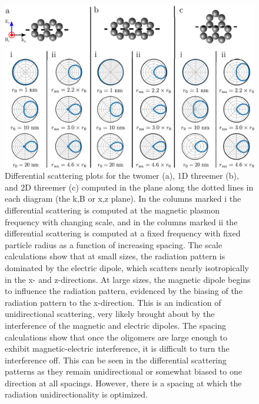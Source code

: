 \documentclass[12pt, letterpaper, twoside]{report}
\begin{document}
\begin{figure}
\centering
\includegraphics[width=6in]{beaming.pdf}
\caption{Differential scattering plots for the twomer (a), 1D threemer (b), and 2D threemer (c) computed in the plane along the dotted lines in each diagram (the k,B or x,z plane). In the columns marked i the differential scattering is computed at the magnetic plasmon frequency with changing scale, and in the columns marked ii the differential scattering is computed at a fixed frequency with fixed particle radius as a function of increasing spacing. The scale calculations show that at small sizes, the radiation pattern is dominated by the electric dipole, which scatters nearly isotropically in the x- and z-directions. At large sizes, the magnetic dipole begins to influence the radiation pattern, evidenced by the biasing of the radiation pattern to the x-direction. This is an indication of unidirectional scattering, very likely brought about by the interference of the magnetic and electric dipoles. The spacing calculations show that once the oligomers are large enough to exhibit magnetic-electric interference, it is difficult to turn the interference off. This can be seen in the differential scattering patterns as they remain unidirectional or somewhat biased to one direction at all spacings. However, there is a spacing at which the radiation unidirectionality is optimized.}
\label{beaming}
\end{figure}
\end{document}
